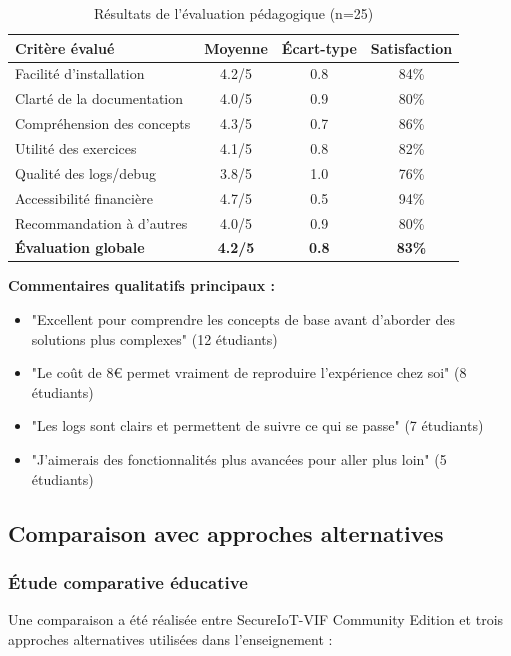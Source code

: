 \begin{table}[h]
\centering
\caption{Résultats de l'évaluation pédagogique (n=25)}
\label{tab:pedagogical-evaluation}
\begin{tabular}{|l|c|c|c|}
\hline
\textbf{Critère évalué} & \textbf{Moyenne} & \textbf{Écart-type} & \textbf{Satisfaction} \\
\hline
Facilité d'installation & 4.2/5 & 0.8 & 84\% \\
Clarté de la documentation & 4.0/5 & 0.9 & 80\% \\
Compréhension des concepts & 4.3/5 & 0.7 & 86\% \\
Utilité des exercices & 4.1/5 & 0.8 & 82\% \\
Qualité des logs/debug & 3.8/5 & 1.0 & 76\% \\
Accessibilité financière & 4.7/5 & 0.5 & 94\% \\
Recommandation à d'autres & 4.0/5 & 0.9 & 80\% \\
\hline
\textbf{Évaluation globale} & \textbf{4.2/5} & \textbf{0.8} & \textbf{83\%} \\
\hline
\end{tabular}
\end{table}

\textbf{Commentaires qualitatifs principaux :}
\begin{itemize}
    \item "Excellent pour comprendre les concepts de base avant d'aborder des solutions plus complexes" (12 étudiants)
    \item "Le coût de 8€ permet vraiment de reproduire l'expérience chez soi" (8 étudiants)
    \item "Les logs sont clairs et permettent de suivre ce qui se passe" (7 étudiants)
    \item "J'aimerais des fonctionnalités plus avancées pour aller plus loin" (5 étudiants)
\end{itemize}

\subsection{Comparaison avec approches alternatives}

\subsubsection{Étude comparative éducative}

Une comparaison a été réalisée entre SecureIoT-VIF Community Edition et trois approches alternatives utilisées dans l'enseignement :

